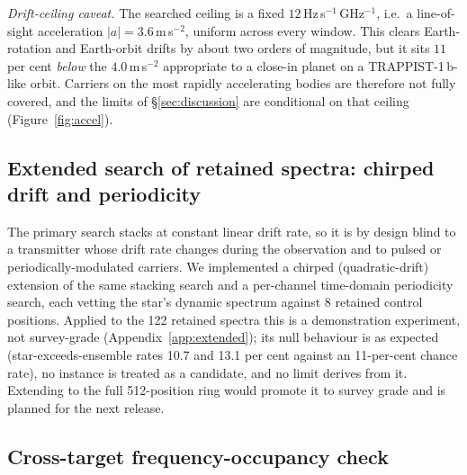 \documentclass{openjournal}
\begin{document}
\emph{Drift-ceiling caveat.} The searched ceiling is a fixed
$12$\,Hz\,s$^{-1}$\,GHz$^{-1}$, i.e.\ a line-of-sight acceleration
$|a| = 3.6$\,m\,s$^{-2}$, uniform across every window. This clears
Earth-rotation and Earth-orbit drifts by about two orders of magnitude,
but it sits $11$ per cent \emph{below} the $4.0$\,m\,s$^{-2}$
appropriate to a close-in planet on a TRAPPIST-1\,b-like orbit. Carriers
on the most rapidly accelerating bodies are therefore not fully covered,
and the limits of \S\ref{sec:discussion} are conditional on that
ceiling (Figure~\ref{fig:accel}).

\subsection{Extended search of retained spectra: chirped drift and
periodicity}
\label{sec:extended}

The primary search stacks at constant linear drift rate, so it is by
design blind to a transmitter whose drift rate changes during the
observation and to pulsed or periodically-modulated carriers. We
implemented a chirped (quadratic-drift) extension of the same
stacking search and a per-channel time-domain periodicity search,
each vetting the star's dynamic spectrum against 8 retained control
positions. Applied to the 122 retained spectra this is a
demonstration experiment, not survey-grade
(Appendix~\ref{app:extended}); its null behaviour is as expected
(star-exceeds-ensemble rates 10.7 and 13.1 per cent against an
11-per-cent chance rate), no instance is treated as a candidate, and
no limit derives from it. Extending to the full 512-position ring
would promote it to survey grade and is planned for the next
release.

\subsection{Cross-target frequency-occupancy check}
\label{sec:freqoccupancy}
\end{document}
